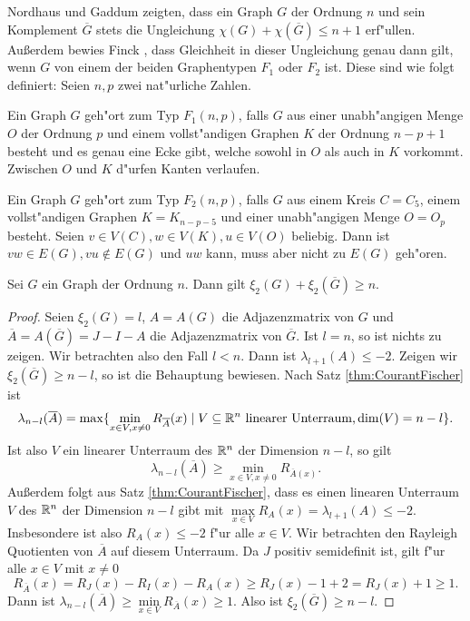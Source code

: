 Nordhaus und Gaddum \cite{NordhausG56} zeigten, dass ein Graph $G$ der Ordnung $n$ und sein Komplement $\overline{G}$ stets die Ungleichung $\chi(G) + \chi(\overline{G}) \leq n+1$ erf"ullen. Au{\ss}erdem bewies Finck \cite{Finck66}, dass Gleichheit in dieser Ungleichung genau dann gilt, wenn $G$ von einem der beiden Graphentypen $F_1$ oder $F_2$ ist. 
Diese sind wie folgt definiert:
Seien $n,p$ zwei nat"urliche Zahlen. 

Ein Graph $G$ geh"ort zum Typ $F_1 (n,p)$, falls $G$ aus einer unabh"angigen Menge $O$ der Ordnung $p$ und einem vollst"andigen Graphen $K$ der Ordnung $n-p+1$ besteht und es genau eine Ecke gibt, welche sowohl in $O$ als auch in $K$ vorkommt. Zwischen $O$ und $K$ d"urfen Kanten verlaufen. 

Ein Graph $G$ geh"ort zum Typ $F_2(n,p)$, falls $G$ aus einem Kreis $C=C_5$, einem vollst"andigen Graphen $K=K_{n-p-5}$ und einer unabh"angigen Menge $O=O_{p}$ besteht. 
Seien $v\in V(C), w\in V(K), u\in V(O)$ beliebig. Dann ist $vw\in E(G), vu\notin E(G) $ und $uw$ kann, muss aber nicht zu $E(G)$ geh"oren.

\begin{theorem}
  Sei $G$ ein Graph der Ordnung $n$. Dann gilt 
  $\xi_{2}(G) + \xi_{2}(\overline{G}) \geq n.$ 
  \label{thm:xikomplement}
\end{theorem}
\begin{proof}
  Seien $\xi_{2}(G) = l$, $A= A(G)$ die Adjazenzmatrix von $G$ und $\overline A = A(\overline{G}) = J-I-A $ die Adjazenzmatrix von $\overline{G}$. 
  Ist $l = n$, so ist nichts zu zeigen. Wir betrachten also den Fall $l< n$. Dann ist $\lambda_{l+1}(A) \leq -2$. Zeigen wir $\xi_{2}(\overline{G}) \geq n-l$, so ist die Behauptung bewiesen. 
  Nach Satz \ref{thm:CourantFischer} ist 
  $$\lambda_{n-l}(\overline{A}) = \max\{\min\limits_{x\in V , x \neq 0} R_{\overline{A}}(x) \;|\;  V\subseteq {\mathbb{R}}^n \text{ linearer Unterraum,} \operatorname{dim}(V) =  n-l \}.$$
  Ist also $V$ ein linearer Unterraum des ${\mathbb{R}}^{n}$ der Dimension $n-l$, so gilt $$\lambda_{n-l} (\overline{A}) \geq \min\limits_{x\in V, x\neq 0} R_{\overline{A}(x)}.$$
  Au{\ss}erdem folgt aus Satz \ref{thm:CourantFischer}, dass es einen linearen Unterraum $V$ des ${\mathbb{R}}^{n}$ der Dimension $n-l$ gibt mit $ \max \limits_{x\in V}R_{A}(x) =\lambda_{l+1} (A)  \leq -2$.
  Insbesondere ist also $R_{A}(x) \leq -2$ f"ur alle $x\in V$.
  Wir betrachten den Rayleigh Quotienten von $\overline{A}$ auf diesem Unterraum. Da $J$ positiv semidefinit ist, gilt f"ur alle $x\in V$ mit $x\neq 0$
  $$R_{\overline{A}}(x) = R_{J}(x) - R_I(x) - R_A(x) \geq  R_J(x) - 1 + 2 = R_J(x) +1  \geq 1.$$
  Dann ist $\lambda_{n-l}(\overline{A}) \geq \min\limits_{x\in V} R_{\overline{A}}(x) \geq 1$. 
  Also ist $\xi_{2}(\overline{G}) \geq n-l$. 
\end{proof}



